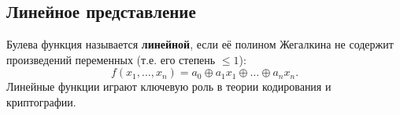 \subsection*{Линейное представление}

Булева функция называется \textbf{линейной}, если её полином Жегалкина не содержит произведений переменных (т.е. его степень $\le 1$):
$$f(x_1, \dots, x_n) = a_0 \oplus a_1 x_1 \oplus \dots \oplus a_n x_n.$$
Линейные функции играют ключевую роль в теории кодирования и криптографии.